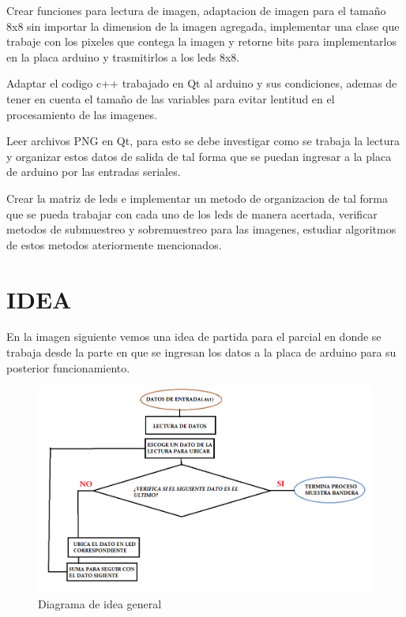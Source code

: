 \documentclass{article}
\begin{document}
Crear funciones para lectura de imagen, adaptacion de imagen para el tamaño 8x8 sin importar la dimension de la imagen agregada, implementar una clase que trabaje con los pixeles que contega la imagen y retorne bits para implementarlos en la placa arduino y trasmitirlos a los leds 8x8.

Adaptar el codigo c++ trabajado en Qt al arduino y sus condiciones, ademas de tener en cuenta el tamaño de las variables para evitar lentitud en el procesamiento de las imagenes.

Leer archivos PNG en Qt, para esto se debe investigar como se trabaja la lectura y organizar estos datos de salida de tal forma que se puedan ingresar a la placa de arduino por las entradas seriales.

Crear la matriz de leds e implementar un metodo de organizacion de tal forma que se pueda trabajar con cada uno  de los leds de manera acertada, verificar metodos de submuestreo y sobremuestreo para las imagenes, estudiar algoritmos de estos metodos ateriormente mencionados.

\section{IDEA}
En la imagen siguiente vemos una idea de partida para el parcial en donde se trabaja desde la parte en que se ingresan los datos a la placa de arduino para su posterior funcionamiento.\\
    \begin{figure}[h]
    \includegraphics[width=13cm]{diagrama.png}
    \centering
    \caption{Diagrama de idea general}
    \label{fig:diagrama}
    \end{figure}






\end{document}
